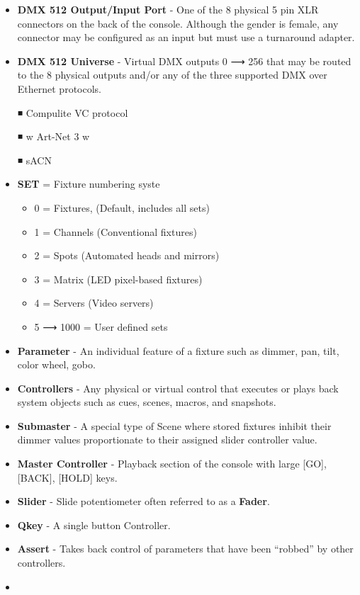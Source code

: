 \documentclass[
]{article}
\providecommand{\tightlist}{%
  \setlength{\itemsep}{0pt}\setlength{\parskip}{0pt}}
\begin{document}
\begin{itemize}
\item
  \textbf{DMX 512 Output/Input Port} - One of the 8 physical 5 pin XLR connectors on the back of the console. Although the gender is female, any connector may be configured as an input but must use a turnaround adapter.
\item
  \textbf{DMX 512 Universe} - Virtual DMX outputs 0 ⟶ 256 that may be routed to the 8 physical outputs and/or any of the three supported DMX over Ethernet protocols.

  ◾ Compulite VC protocol

  ◾ w Art-Net 3 w

  ◾ sACN
\item
  \textbf{SET} = Fixture numbering syste

  \begin{itemize}
  \tightlist
  \item
    0 = Fixtures, (Default, includes all sets)
  \item
    1 = Channels (Conventional fixtures)
  \item
    2 = Spots (Automated heads and mirrors)
  \item
    3 = Matrix (LED pixel-based fixtures)
  \item
    4 = Servers (Video servers)
  \item
    5 ⟶ 1000 = User defined sets
  \end{itemize}
\item
  \textbf{Parameter} - An individual feature of a fixture such as dimmer, pan, tilt, color wheel, gobo.
\item
  \textbf{Controllers} - Any physical or virtual control that executes or plays back system objects such as cues, scenes, macros, and snapshots.
\item
  \textbf{Submaster} - A special type of Scene where stored fixtures inhibit their dimmer values proportionate to their assigned slider controller value.
\item
  \textbf{Master Controller} - Playback section of the console with large {[}GO{]}, {[}BACK{]}, {[}HOLD{]} keys.
\item
  \textbf{Slider} - Slide potentiometer often referred to as a \textbf{Fader}.
\item
  \textbf{Qkey} - A single button Controller.
\item
  \textbf{Assert} - Takes back control of parameters that have been ``robbed'' by other controllers.
\item

\end{itemize}
\end{document}
